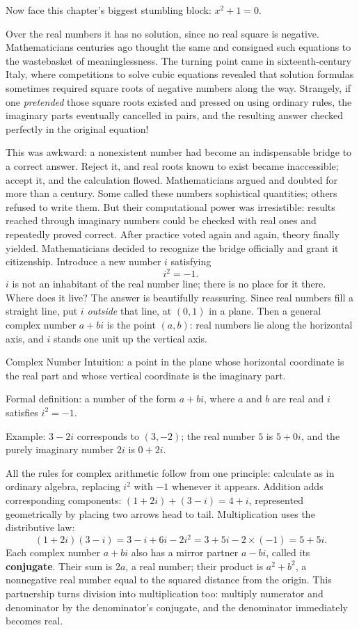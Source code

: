 Now face this chapter's biggest stumbling block: $x^2+1=0$.

Over the real numbers it has no solution, since no real square is negative. Mathematicians centuries ago thought the same and consigned such equations to the wastebasket of meaninglessness. The turning point came in sixteenth-century Italy, where competitions to solve cubic equations revealed that solution formulas sometimes required square roots of negative numbers along the way. Strangely, if one \emph{pretended} those square roots existed and pressed on using ordinary rules, the imaginary parts eventually cancelled in pairs, and the resulting answer checked perfectly in the original equation!

This was awkward: a nonexistent number had become an indispensable bridge to a correct answer. Reject it, and real roots known to exist became inaccessible; accept it, and the calculation flowed. Mathematicians argued and doubted for more than a century. Some called these numbers sophistical quantities; others refused to write them. But their computational power was irresistible: results reached through imaginary numbers could be checked with real ones and repeatedly proved correct. After practice voted again and again, theory finally yielded. Mathematicians decided to recognize the bridge officially and grant it citizenship. Introduce a new number $i$ satisfying
\[
i^2 = -1.
\]
$i$ is not an inhabitant of the real number line; there is no place for it there. Where does it live? The answer is beautifully reassuring. Since real numbers fill a straight line, put $i$ \emph{outside} that line, at $(0,1)$ in a plane. Then a general complex number $a+bi$ is the point $(a,b)$: real numbers lie along the horizontal axis, and $i$ stands one unit up the vertical axis.

\begin{shuyu}{Complex Number}
Intuition: a point in the plane whose horizontal coordinate is the real part and whose vertical coordinate is the imaginary part.

Formal definition: a number of the form $a+bi$, where $a$ and $b$ are real and $i$ satisfies $i^2=-1$.

Example: $3-2i$ corresponds to $(3,-2)$; the real number $5$ is $5+0i$, and the purely imaginary number $2i$ is $0+2i$.
\end{shuyu}

All the rules for complex arithmetic follow from one principle: calculate as in ordinary algebra, replacing $i^2$ with $-1$ whenever it appears. Addition adds corresponding components: $(1+2i)+(3-i)=4+i$, represented geometrically by placing two arrows head to tail. Multiplication uses the distributive law:
\[
(1+2i)(3-i)=3-i+6i-2i^2=3+5i-2\times(-1)=5+5i.
\]
Each complex number $a+bi$ also has a mirror partner $a-bi$, called its \textbf{conjugate}. Their sum is $2a$, a real number; their product is $a^2+b^2$, a nonnegative real number equal to the squared distance from the origin. This partnership turns division into multiplication too: multiply numerator and denominator by the denominator's conjugate, and the denominator immediately becomes real.

